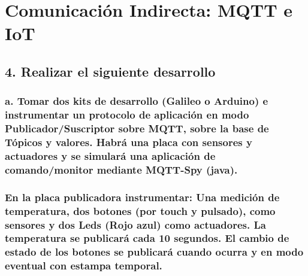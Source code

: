 \documentclass[11pt]{extarticle}
\begin{document}
    \hypertarget{comunicaciuxf3n-indirecta-mqtt-e-iot}{%
\section{Comunicación Indirecta: MQTT e
IoT}\label{comunicaciuxf3n-indirecta-mqtt-e-iot}}

    \hypertarget{realizar-el-siguiente-desarrollo}{%
\subsection{4. Realizar el siguiente
desarrollo}\label{realizar-el-siguiente-desarrollo}}

    \hypertarget{a.-tomar-dos-kits-de-desarrollo-galileo-o-arduino-e-instrumentar-un-protocolo-de-aplicaciuxf3n-en-modo-publicadorsuscriptor-sobre-mqtt-sobre-la-base-de-tuxf3picos-y-valores.-habruxe1-una-placa-con-sensores-y-actuadores-y-se-simularuxe1-una-aplicaciuxf3n-de-comandomonitor-mediante-mqtt-spy-java.}{%
\subsubsection{a. Tomar dos kits de desarrollo (Galileo o Arduino) e
instrumentar un protocolo de aplicación en modo Publicador/Suscriptor
sobre MQTT, sobre la base de Tópicos y valores. Habrá una placa con
sensores y actuadores y se simulará una aplicación de comando/monitor
mediante MQTT-Spy
(java).}\label{a.-tomar-dos-kits-de-desarrollo-galileo-o-arduino-e-instrumentar-un-protocolo-de-aplicaciuxf3n-en-modo-publicadorsuscriptor-sobre-mqtt-sobre-la-base-de-tuxf3picos-y-valores.-habruxe1-una-placa-con-sensores-y-actuadores-y-se-simularuxe1-una-aplicaciuxf3n-de-comandomonitor-mediante-mqtt-spy-java.}}

\hypertarget{en-la-placa-publicadora-instrumentar-una-mediciuxf3n-de-temperatura-dos-botones-por-touch-y-pulsado-como-sensores-y-dos-leds-rojo-azul-como-actuadores.-la-temperatura-se-publicaruxe1-cada-10-segundos.-el-cambio-de-estado-de-los-botones-se-publicaruxe1-cuando-ocurra-y-en-modo-eventual-con-estampa-temporal.}{%
\subsubsection{En la placa publicadora instrumentar: Una medición de
temperatura, dos botones (por touch y pulsado), como sensores y dos Leds
(Rojo azul) como actuadores. La temperatura se publicará cada 10
segundos. El cambio de estado de los botones se publicará cuando ocurra
y en modo eventual con estampa
temporal.}\label{en-la-placa-publicadora-instrumentar-una-mediciuxf3n-de-temperatura-dos-botones-por-touch-y-pulsado-como-sensores-y-dos-leds-rojo-azul-como-actuadores.-la-temperatura-se-publicaruxe1-cada-10-segundos.-el-cambio-de-estado-de-los-botones-se-publicaruxe1-cuando-ocurra-y-en-modo-eventual-con-estampa-temporal.}}
\end{document}
